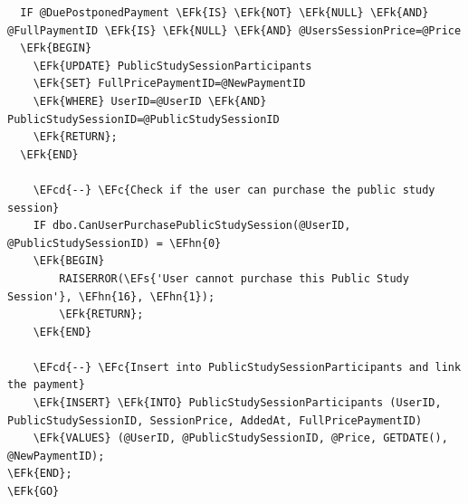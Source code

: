 \documentclass[11pt]{article}
\newcommand{\EFc}[1]{\textcolor{EFc}{\textit{#1}}} %
\newcommand{\EFcd}[1]{\textcolor{EFcd}{\textit{#1}}} %
\newcommand{\EFs}[1]{\textcolor{EFs}{#1}} %
\newcommand{\EFk}[1]{\textcolor{EFk}{\textbf{#1}}} %
\newcommand{\EFhn}[1]{\textcolor{EFhn}{#1}} %
\begin{document}
\begin{Code}
\begin{Verbatim}
  IF @DuePostponedPayment \EFk{IS} \EFk{NOT} \EFk{NULL} \EFk{AND} @FullPaymentID \EFk{IS} \EFk{NULL} \EFk{AND} @UsersSessionPrice=@Price
  \EFk{BEGIN}
    \EFk{UPDATE} PublicStudySessionParticipants
    \EFk{SET} FullPricePaymentID=@NewPaymentID
    \EFk{WHERE} UserID=@UserID \EFk{AND} PublicStudySessionID=@PublicStudySessionID
    \EFk{RETURN};
  \EFk{END}

    \EFcd{--} \EFc{Check if the user can purchase the public study session}
    IF dbo.CanUserPurchasePublicStudySession(@UserID, @PublicStudySessionID) = \EFhn{0}
    \EFk{BEGIN}
        RAISERROR(\EFs{'User cannot purchase this Public Study Session'}, \EFhn{16}, \EFhn{1});
        \EFk{RETURN};
    \EFk{END}

    \EFcd{--} \EFc{Insert into PublicStudySessionParticipants and link the payment}
    \EFk{INSERT} \EFk{INTO} PublicStudySessionParticipants (UserID, PublicStudySessionID, SessionPrice, AddedAt, FullPricePaymentID)
    \EFk{VALUES} (@UserID, @PublicStudySessionID, @Price, GETDATE(), @NewPaymentID);
\EFk{END};
\EFk{GO}
\end{Verbatim}
\end{Code}
\end{document}
